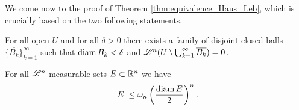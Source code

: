 We come now to the proof of Theorem \ref{thm:equivalence_Haus_Leb}, which is crucially based on the two following statements.

\begin{lemma}
\label{lemmaVitaliCovering}
For all open $U$ and for all $\delta > 0$ there exists a family of disjoint
closed balls $\{\overline{B_k}\}_{k=1}^\infty$ such that $\operatorname{diam} B_k < \delta$ and
$\mathscr{L}^{n}(U \setminus \bigcup_{k=1}^\infty \overline{B_k}) = 0$.
\end{lemma}

\begin{theorem}
\label{thmIso}
For all $\mathscr{L}^{n}$-measurable sets $E \subset \mathbb{R}^n$ we have 
\[
|E| \leq \omega_n \left(\frac{\operatorname{diam} E}{2}\right)^n.
\]
\end{theorem}

